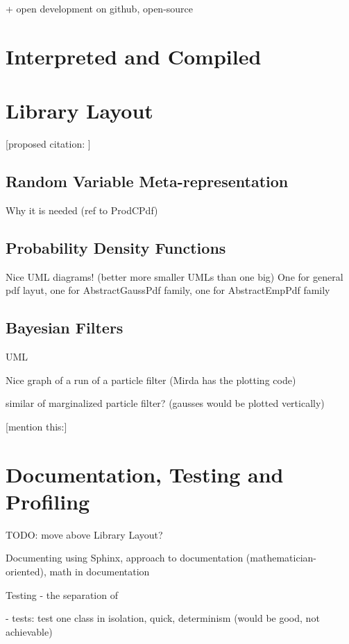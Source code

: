 \documentclass[a4paper,12pt,oneside]{report}
\begin{document}
+ open development on github, open-source

\section{Interpreted and Compiled}

\section{Library Layout}

[proposed citation: \cite{Smi:05}]

\subsection{Random Variable Meta-representation}

Why it is needed (ref to ProdCPdf)

\subsection{Probability Density Functions}

Nice UML diagrams! (better more smaller UMLs than one big) One for general pdf layut, one for
AbstractGaussPdf family, one for AbstractEmpPdf family

\subsection{Bayesian Filters}

UML

Nice graph of a run of a particle filter (Mirda has the plotting code)

similar of marginalized particle filter? (gausses would be plotted vertically)

[mention this:\cite{Smi:10}]

\section{Documentation, Testing and Profiling}

TODO: move above Library Layout?

Documenting using Sphinx, approach to documentation (mathematician-oriented), math in documentation

Testing - the separation of

- tests: test one class in isolation, quick, determinism (would be good, not achievable)
\end{document}
